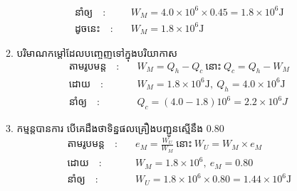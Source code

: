 \documentclass{classes/exam}
\begin{document}
\begin{enumerate}[I]
\begin{enumerate}[k]
\begin{align*}
				\text{នាំឲ្យ}\quad :&\quad W_{M}=4.0\times 10^{6}\times 0.45=1.8\times 10^{6}\si{\joule}\\
				\text{ដូចនេះ} \quad :&\quad W_{M}=1.8\times 10^{6}\si{\joule}
			\end{align*}
		\item បរិមាណកម្តៅដែលបញ្ចេញទៅក្នុងបរិយាកាស
			\begin{align*}
				\text{តាមរូបមន្ត}\quad :&\quad W_{M}=Q_{h}-Q_{c}~\text{នោះ}~Q_{c}=Q_{h}-W_{M}\\
				\text{ដោយ}\quad :&\quad W_{M}=1.8\times10^{6}\si{\joule},~Q_{h}=4.0\times 10^{6}\si{\joule}\\
				\text{នាំឲ្យ}\quad :&\quad Q_{c}=\left(4.0-1.8\right)10^{6}=2.2\times 10^{6}J
			\end{align*}
		\item កម្មន្តបានការ បើគេដឹងថាទិន្នផលគ្រឿងបញ្ជូនស្មើនឹង $0.80$
		\begin{align*}
			\text{តាមរូបមន្ត}\quad :&\quad e_{M}=\frac{W_{U}}{W_{M}}~\text{នោះ}~W_{U}=W_{M}\times e_{M}\\
			\text{ដោយ}\quad :&\quad W_{M}=1.8\times 10^{6},~e_{M}=0.80\\
			\text{នាំឲ្យ}\quad :&\quad W_{U}=1.8\times 10^{6}\times 0.80=1.44\times 10^{6}\si{\joule}
		\end{align*}
	\end{enumerate}
\end{enumerate}
\end{document}
